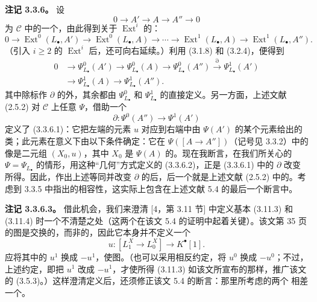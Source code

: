 \textbf{注记 3.3.6。} 设
\[
0\longrightarrow A'\longrightarrow A\longrightarrow A''\longrightarrow0
\]
为 $\mathcal C$ 中的一个，由此得到关于 $\operatorname{Ext}^i$ 的：
\[
0\longrightarrow\operatorname{Ext}^0(L_\bullet,A')\longrightarrow\operatorname{Ext}^0(L_\bullet,A)
\longrightarrow\cdots\longrightarrow\operatorname{Ext}^1(L_\bullet,A)\longrightarrow\operatorname{Ext}^1(L_\bullet,A'').
\]
（引入 $i\geq2$ 的 $\operatorname{Ext}^i$ 后，还可向右延续。）利用 (3.1.8) 和 (3.2.4)，便得到
\[
\begin{aligned}
0&\longrightarrow\Psi^0_{L_\bullet}(A')\longrightarrow\Psi^0_{L_\bullet}(A)
\longrightarrow\Psi^0_{L_\bullet}(A'')\xrightarrow{\partial}\Psi^1_{L_\bullet}(A')\\
&\longrightarrow\Psi^1_{L_\bullet}(A)\longrightarrow\Psi^1_{L_\bullet}(A'').
\end{aligned}\tag{3.3.6.1}
\]
其中除标作 $\partial$ 的外，其余都由 $\Psi^0_{L_\bullet}$ 和 $\Psi^1_{L_\bullet}$ 的直接定义。另一方面，上述文献 (2.5.2) 对 $\mathcal C$ 上任意 $\Psi$，借助一个
\[
\partial:\Psi^0(A'')\longrightarrow\Psi^1(A')\tag{3.3.6.2}
\]
定义了 (3.3.6.1)：它把左端的元素 $u$ 对应到右端中由 $\Psi(A')$ 的某个元素给出的类；此元素在意义下由以下条件确定：它在 $\Psi([A\to A''])$（记号见 3.3.2）中的像是二元组 $(X_0,u)$，其中 $X_0$ 是 $\Psi(A)$ 的。现在我断言，在我们所关心的 $\Psi=\Psi_{L_\bullet}$ 的情形，用这种“几何”方式定义的 (3.3.6.2)，正是 (3.3.6.1) 中的 $\partial$ 改变所得。因此，作出上述等同并改变 $\partial$ 的后，后一个就是上述文献 (2.5.2) 中的。考虑到 3.3.5 中指出的相容性，这实际上包含在上述文献 5.4 的最后一个断言中。

\textbf{注记 3.3.6.3。} 借此机会，我们来澄清 [4，第 3.11 节] 中定义基本 (3.11.3) 和 (3.11.4) 时一个不清楚之处（这两个在该文 5.4 的证明中起着关键）。该文第 35 页的图是交换的，而非的，因此它本身并不定义一个
\[
u:[L^X_1\longrightarrow L^X_0]\longrightarrow K^\bullet[1].
\]
应将其中的 $u^1$ 换成 $-u^1$，使图。（也可以采用相反约定，将 $u^0$ 换成 $-u^0$；不过，上述约定，即把 $u^1$ 改成 $-u^1$，才使所得 (3.11.3) 如该文所宣布的那样，推广该文的 (3.5.3)。）这样澄清定义后，还须修正该文 5.4 的断言：那里所考虑的两个
相差一个。

